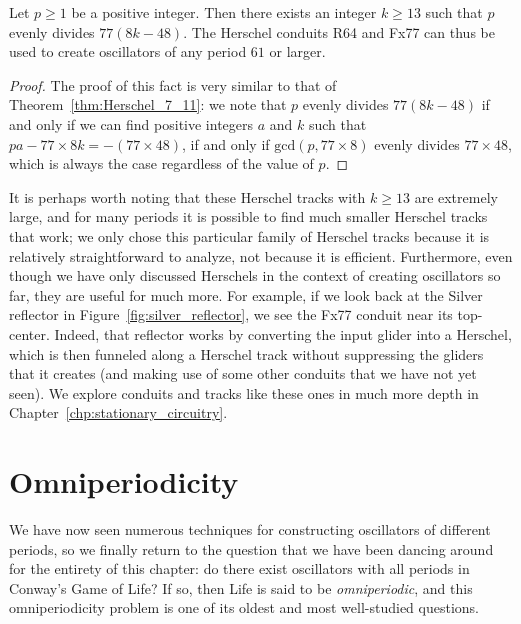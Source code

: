 \begin{theorem}\label{thm:Herschel_61}
	Let $p \geq 1$ be a positive integer. Then there exists an integer $k \geq 13$ such that $p$ evenly divides $77(8k - 48)$. The Herschel conduits R64 and Fx77 can thus be used to create oscillators of any period $61$ or larger.
\end{theorem}

\begin{proof}
	The proof of this fact is very similar to that of Theorem~\ref{thm:Herschel_7_11}: we note that $p$ evenly divides $77(8k - 48)$ if and only if we can find positive integers $a$ and $k$ such that $pa - 77 \times 8k = -(77 \times 48)$, if and only if $\mathrm{gcd}(p,77 \times 8)$ evenly divides $77 \times 48$, which is always the case regardless of the value of $p$.
\end{proof}

It is perhaps worth noting that these Herschel tracks with $k \geq 13$ are extremely large, and for many periods it is possible to find much smaller Herschel tracks that work; we only chose this particular family of Herschel tracks because it is relatively straightforward to analyze, not because it is efficient. Furthermore, even though we have only discussed Herschels in the context of creating oscillators so far, they are useful for much more. For example, if we look back at the Silver reflector in Figure~\ref{fig:silver_reflector}, we see the Fx77 conduit near its top-center. Indeed, that reflector works by converting the input glider into a Herschel, which is then funneled along a Herschel track without suppressing the gliders that it creates (and making use of some other conduits that we have not yet seen). We explore conduits and tracks like these ones in much more depth in Chapter~\ref{chp:stationary_circuitry}.


\section{Omniperiodicity}\label{sec:omniperiodic}

We have now seen numerous techniques for constructing oscillators of different periods, so we finally return to the question that we have been dancing around for the entirety of this chapter: do there exist oscillators with all periods in Conway's Game of Life? If so, then Life is said to be \emph{omniperiodic}, and this omniperiodicity problem is one of its oldest and most well-studied questions.

